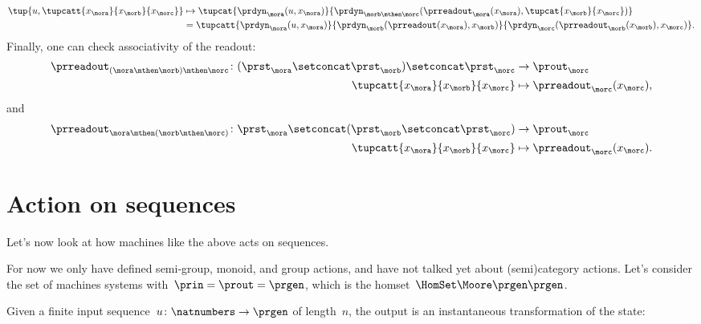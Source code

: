 \begin{solution}
\begin{equation*}
\begin{aligned}
            \tup{u, \tupcatt{x_{\mora}}{x_{\morb}}{x_\morc}}&\mapsto \tupcat{\prdyn_{\mora}(u,x_\mora)}{\prdyn_{\morb\mthen \morc}(\prreadout_{\mora}(x_\mora),\tupcat{x_\morb}{x_\morc})}\\
            &=\tupcatt{\prdyn_\mora(u,x_\mora)}{\prdyn_\morb(\prreadout(x_\mora),x_\morb)}{\prdyn_\morc(\prreadout_\morb(x_\morb),x_\morc)}.
        \end{aligned}
    \end{equation*}
    Finally, one can check associativity of the readout:
    \begin{equation*}
        \label{eq:assoc_moore_3}
        \begin{aligned}
            \prreadout_{(\mora \mthen \morb)\mthen \morc}\colon (\prst_\mora \setconcat \prst_\morb)\setconcat \prst_\morc &\to \prout_\morc\\
            \tupcatt{x_\mora}{x_\morb}{x_\morc} &\mapsto \prreadout_\morc(x_\morc),
        \end{aligned}
    \end{equation*}
    and
    \begin{equation*}
        \label{eq:assoc_moore_4}
        \begin{aligned}
            \prreadout_{\mora \mthen (\morb\mthen \morc)}\colon \prst_\mora \setconcat (\prst_\morb\setconcat \prst_\morc) &\to \prout_\morc\\
            \tupcatt{x_\mora}{x_\morb}{x_\morc} &\mapsto \prreadout_\morc(x_\morc).
        \end{aligned}
    \end{equation*}
\end{solution}

\section{Action on sequences}

Let's now look at how machines like the above acts on sequences.

For now we only have defined semi-group, monoid, and group actions, and have not talked yet about (semi)category actions.
Let's consider the set of machines systems with~$\prin = \prout = \prgen$, which is the homset~$\HomSet\Moore\prgen\prgen$.

Given a finite input sequence~$u\colon \natnumbers \to \prgen$ of length~$n$, the output is an instantaneous transformation of the state:

